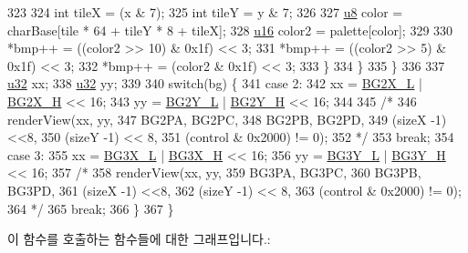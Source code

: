 \begin{DoxyCode}
323         
324         \textcolor{keywordtype}{int} tileX = (x & 7);
325         \textcolor{keywordtype}{int} tileY = y & 7;
326         
327         \mbox{\hyperlink{_system_8h_aed742c436da53c1080638ce6ef7d13de}{u8}} color = charBase[tile * 64 + tileY * 8 + tileX];
328         \mbox{\hyperlink{_system_8h_a9e6c91d77e24643b888dbd1a1a590054}{u16}} color2 = palette[color];
329 
330         *bmp++ = ((color2 >> 10) & 0x1f) << 3;
331         *bmp++ = ((color2 >> 5) & 0x1f) << 3;
332         *bmp++ = (color2 & 0x1f) << 3;        
333       \}
334     \}    
335   \}
336 
337   \mbox{\hyperlink{_system_8h_a10e94b422ef0c20dcdec20d31a1f5049}{u32}} xx;
338   \mbox{\hyperlink{_system_8h_a10e94b422ef0c20dcdec20d31a1f5049}{u32}} yy;
339   
340   \textcolor{keywordflow}{switch}(bg) \{
341   \textcolor{keywordflow}{case} 2:
342     xx = \mbox{\hyperlink{_globals_8cpp_a3430b08164c50d5bebb9bad4d9c850e4}{BG2X\_L}} | \mbox{\hyperlink{_globals_8cpp_a499b313af1e4390f0f42b3626daceee3}{BG2X\_H}} << 16;
343     yy = \mbox{\hyperlink{_globals_8cpp_ae9213b72a93fab65593511949f01563f}{BG2Y\_L}} | \mbox{\hyperlink{_globals_8cpp_aef22925b8185832dab00fdb2d0042666}{BG2Y\_H}} << 16;
344 
345     \textcolor{comment}{/*    }
346 \textcolor{comment}{          renderView(xx, yy, }
347 \textcolor{comment}{          BG2PA, BG2PC,}
348 \textcolor{comment}{          BG2PB, BG2PD,}
349 \textcolor{comment}{          (sizeX -1) <<8,}
350 \textcolor{comment}{          (sizeY -1) << 8,}
351 \textcolor{comment}{          (control & 0x2000) != 0);}
352 \textcolor{comment}{    */}
353     \textcolor{keywordflow}{break};
354   \textcolor{keywordflow}{case} 3:
355     xx = \mbox{\hyperlink{_globals_8cpp_a96800f981e5aabc792e850211c4d453a}{BG3X\_L}} | \mbox{\hyperlink{_globals_8cpp_a01a2b5362be35995562fb6b436a4460b}{BG3X\_H}} << 16;
356     yy = \mbox{\hyperlink{_globals_8cpp_a932f56d63c1006e38ac0b2a6517fce3b}{BG3Y\_L}} | \mbox{\hyperlink{_globals_8cpp_aa7e9d49e83abcb500a1f6a28310d6c34}{BG3Y\_H}} << 16;
357     \textcolor{comment}{/*    }
358 \textcolor{comment}{          renderView(xx, yy, }
359 \textcolor{comment}{          BG3PA, BG3PC,}
360 \textcolor{comment}{          BG3PB, BG3PD,}
361 \textcolor{comment}{          (sizeX -1) <<8,}
362 \textcolor{comment}{          (sizeY -1) << 8,}
363 \textcolor{comment}{          (control & 0x2000) != 0);}
364 \textcolor{comment}{    */}
365     \textcolor{keywordflow}{break};
366   \}
367 \}
\end{DoxyCode}
이 함수를 호출하는 함수들에 대한 그래프입니다.\+:
\nopagebreak
